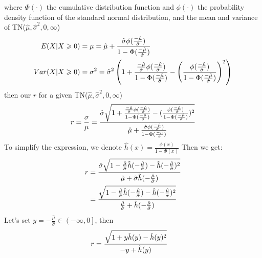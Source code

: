 where $\Phi(\cdot)$ the cumulative distribution function and $\phi(\cdot)$ the probability density function of the standard normal distribution, and the mean and variance of TN($\hat{\mu}, \hat{\sigma}^2, 0,\infty$)
\begin{equation}\notag
	\begin{split}
	E(X | X \geqslant 0)& = \mu =  \hat{\mu} + \frac{\hat{\sigma} \phi(\frac{-\hat{\mu}}{\hat{\sigma}})}{1 - \Phi(\frac{-\hat{\mu} }{\hat{\sigma}})}\\
	Var( X | X \geqslant 0) &= \sigma^2 = \hat{\sigma}^2 \left(1+\frac{\frac{-\hat{\mu}}{\hat{\sigma}} \phi(\frac{-\hat{\mu}}{\hat{\sigma}})}{1 - \Phi(\frac{-\hat{\mu}}{\hat{\sigma}})}-\left(\frac{ \phi(\frac{-\hat{\mu}}{\hat{\sigma}})}{1 - \Phi(\frac{-\hat{\mu}}{\hat{\sigma}})}\right)^2\right)
	\end{split}
\end{equation}
then our $r$ for a given TN($\hat{\mu}, \hat{\sigma}^2, 0,\infty$)
\begin{equation}\notag
	r = \frac{\sigma}{\mu} =  \frac{\hat{\sigma} \sqrt{ 1+\frac{\frac{-\hat{\mu}}{\hat{\sigma}} \phi(\frac{-\hat{\mu}}{\hat{\sigma}})}{1 - \Phi(\frac{-\hat{\mu}}{\hat{\sigma}})}-(\frac{ \phi(\frac{-\hat{\mu}}{\hat{\sigma}})}{1 - \Phi(\frac{-\hat{\mu}}{\hat{\sigma}})})^2}}{  \hat{\mu} + \frac{\hat{\sigma} \phi(\frac{-\hat{\mu}}{\hat{\sigma}})}{1 - \Phi(\frac{-\mu}{\hat{\sigma}})}}
\end{equation}
To simplify the expression, we denote $\hat{h}(x) = \frac{\phi(x)}{1 - \Phi(x)}$
Then we get:
\begin{equation}\notag
	\begin{split}
		r &= \frac{\hat{\sigma} \sqrt{1-\frac{ \hat{\mu}}{\hat{\sigma}} \hat{h}(-\frac{ \hat{\mu}}{\hat{\sigma}}) -\hat{h}(-\frac{ \hat{\mu}}{\hat{\sigma}})^2}}{  \hat{\mu} + \hat{\sigma} \hat{h}(-\frac{ \hat{\mu}}{\hat{\sigma}})} \\&= \frac{ \sqrt{1-\frac{ \hat{\mu}}{\hat{\sigma}} \hat{h}(-\frac{ \hat{\mu}}{\hat{\sigma}}) -\hat{h}(-\frac{ \hat{\mu}}{\sigma})^2}}{ \frac{ \hat{\mu}}{\hat{\sigma}} + \hat{h}(-\frac{ \hat{\mu}}{\hat{\sigma}})} 
	\end{split}
\end{equation} 
Let's set $y = -\frac{ \hat{\mu}}{\hat{\sigma}} \in \left(-\infty, 0 \right]$, then
\begin{equation}\notag
	\begin{split}
		r &= \frac{ \sqrt{1+y\hat{h}(y) -\hat{h}(y)^2}}{ -y + \hat{h}(y)} 
	\end{split}
\end{equation} 
